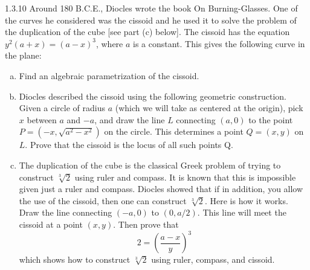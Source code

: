 \documentclass[twoside]{article}
\begin{document}
\begin{ejercicio}{1.3.10}
Around 180 B.C.E., Diocles wrote the book On Burning-Glasses. One of the curves he considered was the cissoid and he used it to solve the problem of the duplication of the cube [see part (c) below]. The cissoid has the equation $y^2(a + x) = (a − x)^3$, where $a$ is
a constant. This gives the following curve in the plane:
\begin{enumerate}[a.]
\item Find an algebraic parametrization of the cissoid.
\item Diocles described the cissoid using the following geometric construction. Given a circle of radius $a$ (which we will take as centered at the origin), pick $x$ between $a$ and $−a$, and draw the line $L$ connecting $(a, 0)$ to the point $P = (−x,\sqrt{a^2 − x^2})$ on the
circle. This determines a point $Q = (x, y)$ on $L$. Prove that the cissoid is the locus of all such points Q.
\item The duplication of the cube is the classical Greek problem of trying to construct $\sqrt[3]{2}$ using ruler and compass. It is known that this is impossible given just a ruler and  compass. Diocles showed that if in addition, you allow the use of the cissoid, then
one can construct $\sqrt[3]{2}$. Here is how it works. Draw the line connecting $(−a, 0)$ to $(0, a/2)$. This line will meet the cissoid at a point $(x, y)$. Then prove that
$$
2=\left(\frac{a-x}{y}\right)^3
$$
which shows how to construct $\sqrt[3]{2}$ using ruler, compass, and cissoid.
\end{enumerate}
\end{ejercicio}
\end{document}
